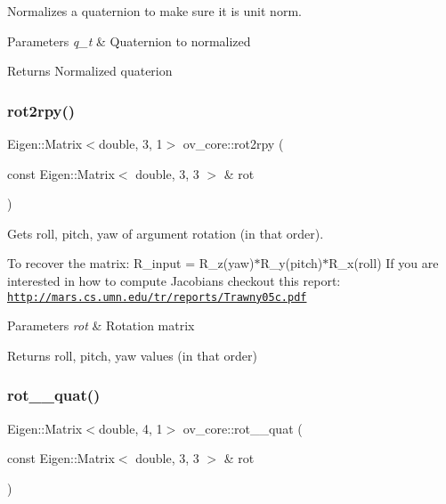 Normalizes a quaternion to make sure it is unit norm. 


\begin{DoxyParams}{Parameters}
{\em q\+\_\+t} & Quaternion to normalized \\
\hline
\end{DoxyParams}
\begin{DoxyReturn}{Returns}
Normalized quaterion 
\end{DoxyReturn}
\mbox{\label{namespaceov__core_af608ab8e3f8cd8554ade192cd804b7ce}} 
\subsubsection{\texorpdfstring{rot2rpy()}{rot2rpy()}}
{\footnotesize\ttfamily Eigen\+::\+Matrix$<$double, 3, 1$>$ ov\+\_\+core\+::rot2rpy (\begin{DoxyParamCaption}\item[{const Eigen\+::\+Matrix$<$ double, 3, 3 $>$ \&}]{rot }\end{DoxyParamCaption})\hspace{0.3cm}{\ttfamily [inline]}}



Gets roll, pitch, yaw of argument rotation (in that order). 

To recover the matrix\+: R\+\_\+input = R\+\_\+z(yaw)$\ast$\+R\+\_\+y(pitch)$\ast$\+R\+\_\+x(roll) If you are interested in how to compute Jacobians checkout this report\+: \href{http://mars.cs.umn.edu/tr/reports/Trawny05c.pdf}{\tt http\+://mars.\+cs.\+umn.\+edu/tr/reports/\+Trawny05c.\+pdf}


\begin{DoxyParams}{Parameters}
{\em rot} & Rotation matrix \\
\hline
\end{DoxyParams}
\begin{DoxyReturn}{Returns}
roll, pitch, yaw values (in that order) 
\end{DoxyReturn}
\mbox{\label{namespaceov__core_a1d2aafa6a756bb70fcd9f52695b4e573}} 
\subsubsection{\texorpdfstring{rot\+\_\+\_\+quat()}{rot\_2\_quat()}}
{\footnotesize\ttfamily Eigen\+::\+Matrix$<$double, 4, 1$>$ ov\+\_\+core\+::rot\+\_\+\_\+quat (\begin{DoxyParamCaption}\item[{const Eigen\+::\+Matrix$<$ double, 3, 3 $>$ \&}]{rot }\end{DoxyParamCaption})\hspace{0.3cm}{\ttfamily [inline]}}




